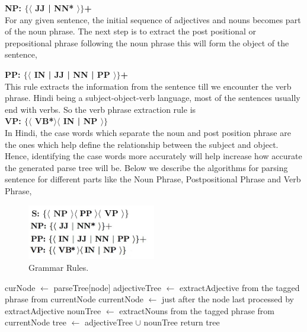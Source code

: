\textbf {NP: $\{ \langle$ JJ | NN* $\rangle \}$+}  \\

For any given sentence, the initial sequence of adjectives and nouns becomes part of the noun phrase. The next step is to extract the post positional or prepositional phrase following the noun phrase this will form the object of the sentence,

\textbf {PP: $\{ \langle$ IN | JJ | NN | PP $\rangle \}$+} \\

This rule extracts the information from the sentence till we encounter the verb phrase. Hindi being a subject-object-verb language, most of the sentences usually end with verbs. So the verb phrase extraction rule is \\

\textbf {VP: $\{ \langle$ VB*$\rangle \langle $ IN | NP $\rangle \}$} \\

In Hindi, the case words which separate the noun and post position phrase are the ones which help define the relationship between the subject and object. Hence, identifying the case words more accurately will help increase how accurate the generated parse tree will be. Below we describe the algorithms for parsing sentence for different parts like the Noun Phrase, Postpositional Phrase and Verb Phrase,

\begin{figure}[htb]
\centering
\includegraphics[width=0.5\textwidth]{images/gammarrules.jpg}
\caption{Grammar Rules.} 
\label{fig:gammarrules}
\end{figure}

\begin {algorithm}
\caption {Extract Noun Phrase}
\begin {algorithmic}[1]
\State curNode $\gets$ parseTree[node]
\State adjectiveTree $\gets$ extractAdjective from the tagged phrase from currentNode
\State currentNode $\gets$ just after the node last processed by extractAdjective
\State nounTree $\gets$ extractNouns from the tagged phrase from currentNode
\State tree $\gets$ adjectiveTree $\cup$ nounTree 
\State return tree
\EndProcedure		
\end {algorithmic}
\end {algorithm}

